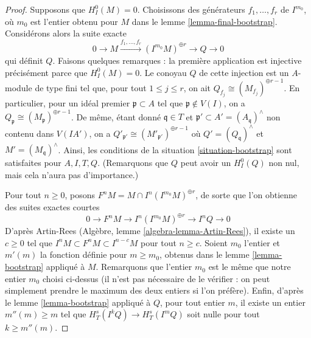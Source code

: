 \begin{proof}
\medskip\noindent
Supposons que $H^0_I(M) = 0$. Choisissons des générateurs
$f_1, \ldots, f_r$ de $I^{m_0}$, où $m_0$ est l'entier
obtenu pour $M$ dans le lemme \ref{lemma-final-bootstrap}.
Considérons alors la suite exacte
$$
0 \to M \xrightarrow{f_1, \ldots, f_r}
(I^{m_0}M)^{\oplus r} \to Q \to 0
$$
qui définit $Q$. Faisons quelques remarques : la première application est injective
précisément parce que $H^0_I(M) = 0$. Le conoyau $Q$ de cette injection
est un $A$-module de type fini tel que, pour tout $1 \leq j \leq r$,
on ait $Q_{f_j} \cong (M_{f_j})^{\oplus r - 1}$.
En particulier, pour un idéal premier $\mathfrak p \subset A$
tel que $\mathfrak p \not \in V(I)$, on a
$Q_\mathfrak p \cong (M_\mathfrak p)^{\oplus r - 1}$.
De même, étant donné $\mathfrak q \in T$ et
$\mathfrak p' \subset A' = (A_\mathfrak q)^\wedge$
non contenu dans $V(IA')$, on a
$Q'_{\mathfrak p'} \cong (M'_{\mathfrak p'})^{\oplus r - 1}$
où $Q' = (Q_\mathfrak q)^\wedge$ et $M' = (M_\mathfrak q)^\wedge$.
Ainsi, les conditions de la situation \ref{situation-bootstrap}
sont satisfaites pour $A, I, T, Q$. (Remarquons que $Q$ peut avoir
un $H^0_I(Q)$ non nul, mais cela n'aura pas d'importance.)

\medskip\noindent
Pour tout $n \geq 0$, posons $F^nM = M \cap I^n(I^{m_0}M)^{\oplus r}$,
de sorte que l'on obtienne des suites exactes courtes
$$
0 \to F^nM \to I^n(I^{m_0}M)^{\oplus r} \to I^nQ \to 0
$$
D'après Artin-Rees (Algèbre, lemme \ref{algebra-lemma-Artin-Rees}),
il existe un $c \geq 0$ tel que
$I^n M \subset F^nM \subset I^{n - c}M$ pour tout $n \geq c$.
Soient $m_0$ l'entier et $m'(m)$
la fonction définie pour $m \geq m_0$,
obtenus dans le lemme \ref{lemma-bootstrap}
appliqué à $M$. Remarquons que l'entier $m_0$
est le même que notre entier $m_0$ choisi ci-dessus (il n'est pas nécessaire de
le vérifier : on peut simplement prendre le maximum des deux entiers si
l'on préfère). Enfin, d'après le lemme \ref{lemma-bootstrap}
appliqué à $Q$, pour tout entier $m$, il existe un entier
$m''(m) \geq m$ tel que $H^s_T(I^kQ) \to H^s_T(I^mQ)$
soit nulle pour tout $k \geq m''(m)$.


\end{proof}

